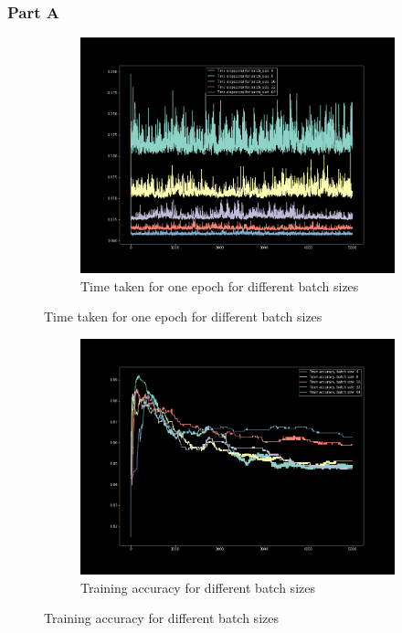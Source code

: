 \subsubsection{Part A}
\begin{figure}[H]
    \begin{subfigure}{1\textwidth}
        \centering
        \includegraphics[width=0.8\linewidth]{assets/plots/part1_Q2a_1.png}
        \caption{Time taken for one epoch for different batch sizes}
        \label{fig:batch_time}
    \end{subfigure}
\end{figure}
\begin{figure}[H]
    \ContinuedFloat
    \begin{subfigure}{1\textwidth}
        \centering
        \includegraphics[width=0.8\linewidth]{assets/plots/part1_Q2a_4.png}
        \caption{Training accuracy for different batch sizes}
        \label{fig:train_batch}
    \end{subfigure}
\end{figure}

